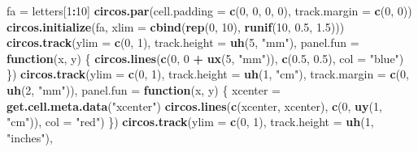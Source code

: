 \documentclass[]{book}
\newenvironment{Shaded}{\begin{snugshade}}{\end{snugshade}}
\newcommand{\KeywordTok}[1]{\textcolor[rgb]{0.13,0.29,0.53}{\textbf{#1}}}
\newcommand{\DataTypeTok}[1]{\textcolor[rgb]{0.13,0.29,0.53}{#1}}
\newcommand{\DecValTok}[1]{\textcolor[rgb]{0.00,0.00,0.81}{#1}}
\newcommand{\FloatTok}[1]{\textcolor[rgb]{0.00,0.00,0.81}{#1}}
\newcommand{\StringTok}[1]{\textcolor[rgb]{0.31,0.60,0.02}{#1}}
\newcommand{\ControlFlowTok}[1]{\textcolor[rgb]{0.13,0.29,0.53}{\textbf{#1}}}
\newcommand{\OperatorTok}[1]{\textcolor[rgb]{0.81,0.36,0.00}{\textbf{#1}}}
\newcommand{\NormalTok}[1]{#1}
\begin{document}
\begin{Shaded}
\begin{Highlighting}[]
\NormalTok{fa =}\StringTok{ }\NormalTok{letters[}\DecValTok{1}\OperatorTok{:}\DecValTok{10}\NormalTok{]}
\KeywordTok{circos.par}\NormalTok{(}\DataTypeTok{cell.padding =} \KeywordTok{c}\NormalTok{(}\DecValTok{0}\NormalTok{, }\DecValTok{0}\NormalTok{, }\DecValTok{0}\NormalTok{, }\DecValTok{0}\NormalTok{), }\DataTypeTok{track.margin =} \KeywordTok{c}\NormalTok{(}\DecValTok{0}\NormalTok{, }\DecValTok{0}\NormalTok{))}
\KeywordTok{circos.initialize}\NormalTok{(fa, }\DataTypeTok{xlim =} \KeywordTok{cbind}\NormalTok{(}\KeywordTok{rep}\NormalTok{(}\DecValTok{0}\NormalTok{, }\DecValTok{10}\NormalTok{), }\KeywordTok{runif}\NormalTok{(}\DecValTok{10}\NormalTok{, }\FloatTok{0.5}\NormalTok{, }\FloatTok{1.5}\NormalTok{)))}
\KeywordTok{circos.track}\NormalTok{(}\DataTypeTok{ylim =} \KeywordTok{c}\NormalTok{(}\DecValTok{0}\NormalTok{, }\DecValTok{1}\NormalTok{), }\DataTypeTok{track.height =} \KeywordTok{uh}\NormalTok{(}\DecValTok{5}\NormalTok{, }\StringTok{"mm"}\NormalTok{),}
    \DataTypeTok{panel.fun =} \ControlFlowTok{function}\NormalTok{(x, y) \{}
        \KeywordTok{circos.lines}\NormalTok{(}\KeywordTok{c}\NormalTok{(}\DecValTok{0}\NormalTok{, }\DecValTok{0} \OperatorTok{+}\StringTok{ }\KeywordTok{ux}\NormalTok{(}\DecValTok{5}\NormalTok{, }\StringTok{"mm"}\NormalTok{)), }\KeywordTok{c}\NormalTok{(}\FloatTok{0.5}\NormalTok{, }\FloatTok{0.5}\NormalTok{), }\DataTypeTok{col =} \StringTok{"blue"}\NormalTok{)}
\NormalTok{    \})}
\KeywordTok{circos.track}\NormalTok{(}\DataTypeTok{ylim =} \KeywordTok{c}\NormalTok{(}\DecValTok{0}\NormalTok{, }\DecValTok{1}\NormalTok{), }\DataTypeTok{track.height =} \KeywordTok{uh}\NormalTok{(}\DecValTok{1}\NormalTok{, }\StringTok{"cm"}\NormalTok{),}
    \DataTypeTok{track.margin =} \KeywordTok{c}\NormalTok{(}\DecValTok{0}\NormalTok{, }\KeywordTok{uh}\NormalTok{(}\DecValTok{2}\NormalTok{, }\StringTok{"mm"}\NormalTok{)),}
    \DataTypeTok{panel.fun =} \ControlFlowTok{function}\NormalTok{(x, y) \{}
\NormalTok{        xcenter =}\StringTok{ }\KeywordTok{get.cell.meta.data}\NormalTok{(}\StringTok{"xcenter"}\NormalTok{)}
        \KeywordTok{circos.lines}\NormalTok{(}\KeywordTok{c}\NormalTok{(xcenter, xcenter), }\KeywordTok{c}\NormalTok{(}\DecValTok{0}\NormalTok{, }\KeywordTok{uy}\NormalTok{(}\DecValTok{1}\NormalTok{, }\StringTok{"cm"}\NormalTok{)), }\DataTypeTok{col =} \StringTok{"red"}\NormalTok{)}
\NormalTok{    \})}
\KeywordTok{circos.track}\NormalTok{(}\DataTypeTok{ylim =} \KeywordTok{c}\NormalTok{(}\DecValTok{0}\NormalTok{, }\DecValTok{1}\NormalTok{), }\DataTypeTok{track.height =} \KeywordTok{uh}\NormalTok{(}\DecValTok{1}\NormalTok{, }\StringTok{"inches"}\NormalTok{),}

\end{Highlighting}
\end{Shaded}
\end{document}
